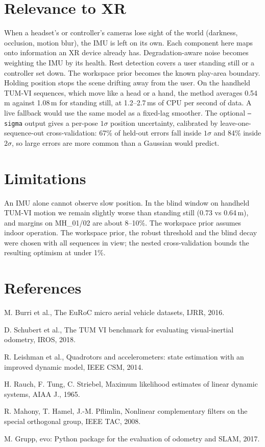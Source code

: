 \documentclass[10pt,a4paper,twocolumn]{article}
\begin{document}
\section{Relevance to XR}
When a headset's or controller's cameras lose sight of the world (darkness, occlusion, motion blur), the IMU is left on its own. Each component here maps onto information an XR device already has. Degradation-aware noise becomes weighting the IMU by its health. Rest detection covers a user standing still or a controller set down. The workspace prior becomes the known play-area boundary. Holding position stops the scene drifting away from the user. On the handheld TUM-VI sequences, which move like a head or a hand, the method averages 0.54\,m against 1.08\,m for standing still, at 1.2--2.7\,ms of CPU per second of data. A live fallback would use the same model as a fixed-lag smoother. The optional \texttt{--sigma} output gives a per-pose $1\sigma$ position uncertainty, calibrated by leave-one-sequence-out cross-validation: 67\% of held-out errors fall inside $1\sigma$ and 84\% inside $2\sigma$, so large errors are more common than a Gaussian would predict.

\section{Limitations}
An IMU alone cannot observe slow position. In the blind window on handheld TUM-VI motion we remain slightly worse than standing still (0.73 vs 0.64\,m), and margins on MH\_01/02 are about 8--10\%. The workspace prior assumes indoor operation. The workspace prior, the robust threshold and the blind decay were chosen with all sequences in view; the nested cross-validation bounds the resulting optimism at under 1\%.

\small
\section*{References}
\begin{enumerate}[label={[\arabic*]}]
\item M. Burri et al., The EuRoC micro aerial vehicle datasets, IJRR, 2016.
\item D. Schubert et al., The TUM VI benchmark for evaluating visual-inertial odometry, IROS, 2018.
\item R. Leishman et al., Quadrotors and accelerometers: state estimation with an improved dynamic model, IEEE CSM, 2014.
\item H. Rauch, F. Tung, C. Striebel, Maximum likelihood estimates of linear dynamic systems, AIAA J., 1965.
\item R. Mahony, T. Hamel, J.-M. Pflimlin, Nonlinear complementary filters on the special orthogonal group, IEEE TAC, 2008.
\item M. Grupp, evo: Python package for the evaluation of odometry and SLAM, 2017.
\end{enumerate}
\end{document}
